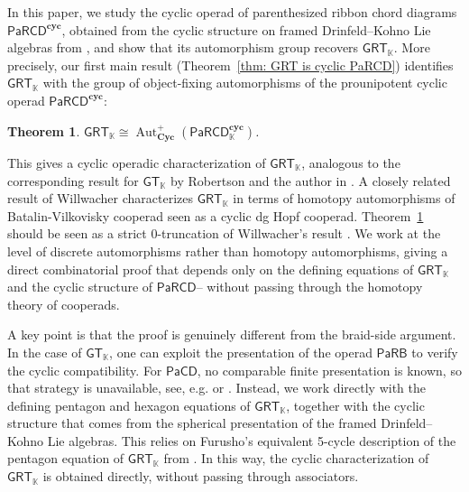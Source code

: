 \documentclass{amsart}
\newcommand{\kk}{\mathbb{K}}    %
\newcommand{\PaRB}{\mathsf{PaRB}}
\newcommand{\PaRCD}{\mathsf{PaRCD}}
\newcommand{\PaCD}{\mathsf{PaCD}}
\newcommand{\hPaRCD}{{\PaRCD}_{\kk}}
\newcommand{\cyc}{\mathbf{cyc}}
\newcommand{\Cyc}{\mathbf{Cyc}}
\newcommand{\Aut}{\operatorname{Aut}}
\newcommand{\GT}{{\mathsf{GT}}}
\newcommand{\GRT}{{\mathsf{GRT}}}
\newtheorem{Th}{Theorem}\renewcommand{\theTh}{\Alph{Th}}
\theoremstyle{definition}
\numberwithin{equation}{section}
\begin{document}
In this paper, we study the cyclic operad of parenthesized ribbon chord diagrams $ \PaRCD^{\cyc} $, obtained from the cyclic structure on framed Drinfeld--Kohno Lie algebras from \cite{campos2019configuration, severa2009formality}, and show that its automorphism group recovers $\GRT_{\kk} $. More precisely, our first main result (Theorem~\ref{thm: GRT is cyclic PaRCD}) identifies $ \GRT_{\kk} $ with the group of object-fixing automorphisms of the prounipotent cyclic operad $ \PaRCD^{\cyc} $:
\begin{Th}\label{thmA}
    $\GRT_{\kk} \cong \Aut_{\Cyc}^{+}(\hPaRCD^{\cyc})$.
\end{Th}
This gives a cyclic operadic characterization of $ \GRT_{\kk} $, analogous to the corresponding result for $ \GT_{\kk}$ by Robertson and the author in \cite{RS2025cyclicgt}. A closely related result of Willwacher \cite{willwacher2024cyclic} characterizes $\GRT_{\kk}$ in terms of homotopy automorphisms of Batalin-Vilkovisky cooperad seen as a cyclic dg Hopf cooperad. Theorem~\ref{thmA} should be seen as a strict $0$-truncation of Willwacher's result \cite[Corollary 1.5]{willwacher2024cyclic}. We work at the level of discrete automorphisms rather than homotopy automorphisms, giving a direct combinatorial proof that depends only on the defining equations of $\GRT_{\kk}$
and the cyclic structure of $\PaRCD$-- without passing through the homotopy theory of cooperads.

A key point is that the proof is genuinely different from the braid-side argument. In the case of $ \GT_{\kk} $, one can exploit the presentation of the operad $ \PaRB $ to verify the cyclic compatibility. For $ \PaCD $, no comparable finite presentation is known, so that strategy is unavailable, see, e.g. \cite[Remark 2.24]{calaque2024associatorsoperadicpointview} or \cite[Section 10.2]{FresseBook1}. Instead, we work directly with the defining pentagon and hexagon equations of $ \GRT_{\kk} $, together with the cyclic structure that comes from the spherical presentation of the framed Drinfeld--Kohno Lie algebras. This relies on Furusho's equivalent 5-cycle description of the pentagon equation of $\GRT_{\kk}$ from \cite{Furusho_pentagon}. In this way, the cyclic characterization of $ \GRT_{\kk} $ is obtained directly, without passing through associators. 
\end{document}
